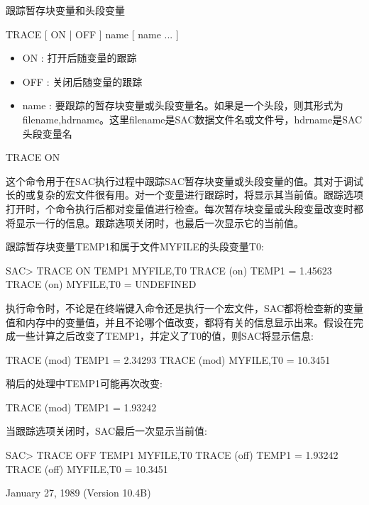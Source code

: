 \label{cmd:trace}

跟踪暂存块变量和头段变量

TRACE [ ON | OFF ] name [ name ... ]

\begin{itemize}
\item ON : 打开后随变量的跟踪 
\item OFF : 关闭后随变量的跟踪 
\item name : 要跟踪的暂存块变量或头段变量名。如果是一个头段，则其形式为filename,hdrname。这里filename是SAC数据文件名或文件号，hdrname是SAC头段变量名 
\end{itemize}

TRACE ON

这个命令用于在SAC执行过程中跟踪SAC暂存块变量或头段变量的值。其对于调试长的或复杂的宏文件很有用。对一个变量进行跟踪时，将显示其当前值。跟踪选项打开时，个命令执行后都对变量值进行检查。每次暂存块变量或头段变量改变时都将显示一行的信息。跟踪选项关闭时，也最后一次显示它的当前值。

跟踪暂存块变量TEMP1和属于文件MYFILE的头段变量T0:
\begin{SACCode}
SAC> TRACE ON TEMP1 MYFILE,T0
  TRACE  (on) TEMP1 = 1.45623
  TRACE  (on) MYFILE,T0 = UNDEFINED
\end{SACCode}

执行命令时，不论是在终端键入命令还是执行一个宏文件，SAC都将检查新的变量值和内存中的变量值，并且不论哪个值改变，都将有关的信息显示出来。假设在完成一些计算之后改变了TEMP1，并定义了T0的值，则SAC将显示信息:
\begin{SACCode}
  TRACE (mod) TEMP1 = 2.34293
  TRACE (mod) MYFILE,T0 = 10.3451
\end{SACCode}

稍后的处理中TEMP1可能再次改变:
\begin{SACCode}
  TRACE (mod) TEMP1 = 1.93242
\end{SACCode}

当跟踪选项关闭时，SAC最后一次显示当前值:
\begin{SACCode}
SAC> TRACE OFF TEMP1 MYFILE,T0
  TRACE (off) TEMP1 = 1.93242
  TRACE (off) MYFILE,T0 = 10.3451
\end{SACCode}

January 27, 1989 (Version 10.4B)

